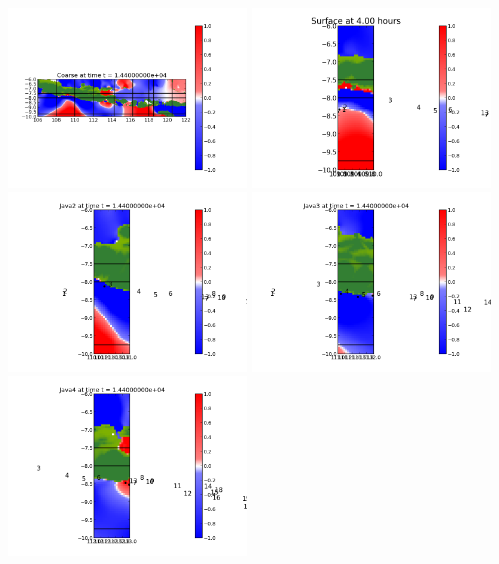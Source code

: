 \documentclass[11pt]{article}
\begin{document}
\vskip 10pt 
\includegraphics[width=0.475\textwidth]{frame0016fig0.png}
\includegraphics[width=0.475\textwidth]{frame0016fig15.png}
\vskip 10pt 
\includegraphics[width=0.475\textwidth]{frame0016fig25.png}
\includegraphics[width=0.475\textwidth]{frame0016fig20.png}
\vskip 10pt 
\includegraphics[width=0.475\textwidth]{frame0016fig30.png}
\end{document}
